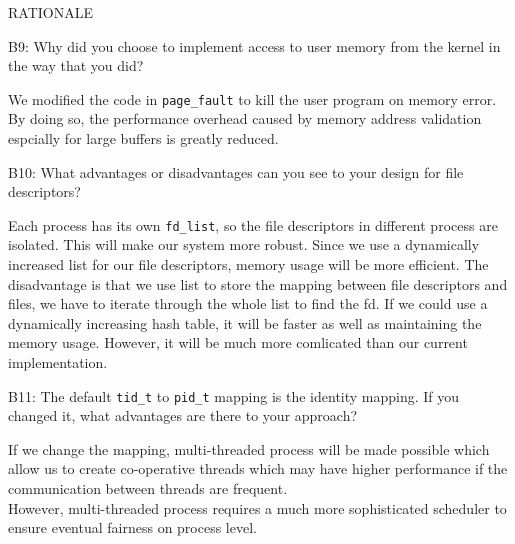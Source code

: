 \begin{aspect}{RATIONALE}
	\begin{qc}
		B9: Why did you choose to implement access to user memory from the kernel in the way that you did?
	\end{qc}
	We modified the code in \lstinline{page_fault} to kill the user program on memory error.
	By doing so, the performance overhead caused by memory address validation espcially for large buffers is greatly reduced.

	\begin{qc}
		B10: What advantages or disadvantages can you see to your design for file descriptors?
	\end{qc}
	Each process has its own \lstinline{fd_list}, so the file descriptors in different process are isolated. This will make our system more robust. Since we use a dynamically increased list for our file descriptors, memory usage will be more efficient. The disadvantage is that we use list to store the mapping between file descriptors and files, we have to iterate through the whole list to find the fd. If we could use a dynamically increasing hash table, it will be faster as well as maintaining the memory usage. However, it will be much more comlicated than our current implementation.

	\begin{qc}
		B11: The default \lstinline{tid_t} to \lstinline{pid_t} mapping is the identity mapping.
		If you changed it, what advantages are there to your approach?
	\end{qc}
	If we change the mapping, multi-threaded process will be made possible which allow us to create co-operative threads which may have higher performance if the communication between threads are frequent.\\
	However, multi-threaded process requires a much more sophisticated scheduler to ensure eventual fairness on process level.
\end{aspect}
